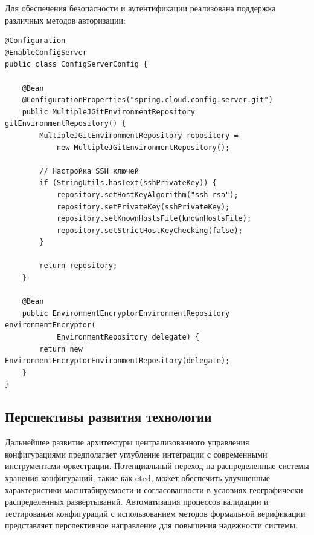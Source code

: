 Для обеспечения безопасности и аутентификации реализована поддержка различных методов авторизации:
\begin{lstlisting}
@Configuration
@EnableConfigServer
public class ConfigServerConfig {

    @Bean
    @ConfigurationProperties("spring.cloud.config.server.git")
    public MultipleJGitEnvironmentRepository gitEnvironmentRepository() {
        MultipleJGitEnvironmentRepository repository =
            new MultipleJGitEnvironmentRepository();

        // Настройка SSH ключей
        if (StringUtils.hasText(sshPrivateKey)) {
            repository.setHostKeyAlgorithm("ssh-rsa");
            repository.setPrivateKey(sshPrivateKey);
            repository.setKnownHostsFile(knownHostsFile);
            repository.setStrictHostKeyChecking(false);
        }

        return repository;
    }

    @Bean
    public EnvironmentEncryptorEnvironmentRepository environmentEncryptor(
            EnvironmentRepository delegate) {
        return new EnvironmentEncryptorEnvironmentRepository(delegate);
    }
}
\end{lstlisting}

\subsection{Перспективы развития технологии}

Дальнейшее развитие архитектуры централизованного управления конфигурациями предполагает углубление интеграции с современными инструментами оркестрации. Потенциальный переход на распределенные системы хранения конфигураций, такие как etcd, может обеспечить улучшенные характеристики масштабируемости и согласованности в условиях географически распределенных развертываний. Автоматизация процессов валидации и тестирования конфигураций с использованием методов формальной верификации представляет перспективное направление для повышения надежности системы.
